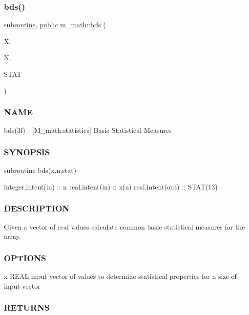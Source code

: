 \subsubsection{\texorpdfstring{bds()}{bds()}}
{\footnotesize\ttfamily \hyperlink{M__stopwatch_83_8txt_acfbcff50169d691ff02d4a123ed70482}{subroutine}, \hyperlink{M__stopwatch_83_8txt_a2f74811300c361e53b430611a7d1769f}{public} m\+\_\+math\+::bds (\begin{DoxyParamCaption}\item[{\hyperlink{read__watch_83_8txt_abdb62bde002f38ef75f810d3a905a823}{real}, dimension(n), intent(\hyperlink{M__journal_83_8txt_afce72651d1eed785a2132bee863b2f38}{in})}]{X,  }\item[{integer, intent(\hyperlink{M__journal_83_8txt_afce72651d1eed785a2132bee863b2f38}{in})}]{N,  }\item[{\hyperlink{read__watch_83_8txt_abdb62bde002f38ef75f810d3a905a823}{real}, dimension(13), intent(out)}]{S\+T\+AT }\end{DoxyParamCaption})}



\subsubsection*{N\+A\+ME}

bds(3f) -\/ \mbox{[}M\+\_\+math\+:statistics\mbox{]} Basic Statistical Measures \subsubsection*{S\+Y\+N\+O\+P\+S\+IS}

subroutine bds(x,n,stat)

integer,intent(in) \+:\+: n real,intent(in) \+:\+: x(n) real,intent(out) \+:\+: S\+T\+A\+T(13) \subsubsection*{D\+E\+S\+C\+R\+I\+P\+T\+I\+ON}

\begin{DoxyVerb} Given a vector of real values calculate common basic statistical measures for
 the array.
\end{DoxyVerb}


\subsubsection*{O\+P\+T\+I\+O\+NS}

x R\+E\+AL input vector of values to determine statistical properties for n size of input vector \subsubsection*{R\+E\+T\+U\+R\+NS}

